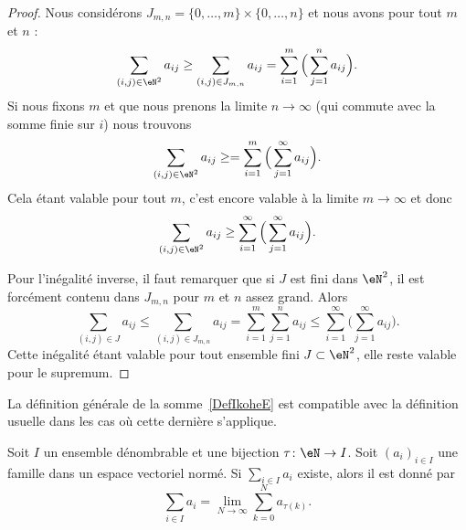 \begin{proof}
    Nous considérons \( J_{m,n}=\{ 0,\ldots, m \}\times \{ 0,\ldots, n \}\) et nous avons pour tout \( m\) et \( n\) :
    \begin{equation}
        \sum_{(i,j)\in \eN^2}a_{ij}\geq \sum_{(i,j)\in J_{m,n}}a_{ij}=\sum_{i=1}^m\Big( \sum_{j=1}^na_{ij} \Big).
    \end{equation}
    Si nous fixons \( m\) et que nous prenons la limite \( n\to \infty\) (qui commute avec la somme finie sur \( i\)) nous trouvons
    \begin{equation}
        \sum_{(i,j)\in \eN^2}a_{ij}\geq =\sum_{i=1}^m\Big( \sum_{j=1}^{\infty}a_{ij} \Big).
    \end{equation}
    Cela étant valable pour tout \( m\), c'est encore valable à la limite \( m\to \infty\) et donc
    \begin{equation}
        \sum_{(i,j)\in \eN^2}a_{ij}\geq \sum_{i=1}^{\infty}\Big( \sum_{j=1}^{\infty}a_{ij} \Big).
    \end{equation}

    Pour l'inégalité inverse, il faut remarquer que si \( J\) est fini dans \( \eN^2\), il est forcément contenu dans \( J_{m,n}\) pour \( m\) et \( n\) assez grand. Alors
    \begin{equation}
        \sum_{(i,j)\in J}a_{ij}\leq \sum_{(i,j)\in J_{m,n}}a_{ij}=\sum_{i=1}^m\sum_{j=1}^na_{ij}\leq \sum_{i=1}^{\infty}\Big( \sum_{j=1}^{\infty}a_{ij} \Big).
    \end{equation}
    Cette inégalité étant valable pour tout ensemble fini \( J\subset \eN^2\), elle reste valable pour le supremum.
\end{proof}

La définition générale de la somme~\ref{DefIkoheE} est compatible avec la définition usuelle dans les cas où cette dernière s'applique.
\begin{proposition}\label{PropoWHdjw}
    Soit \( I\) un ensemble dénombrable et une bijection \( \tau\colon \eN\to I\). Soit \( (a_i)_{i\in I}\) une famille dans un espace vectoriel normé.  Si \( \sum_{i\in I}a_i\) existe, alors il est donné par
    \begin{equation}
        \sum_{i\in I}a_i=\lim_{N\to \infty} \sum_{k=0}^Na_{\tau(k)}.
    \end{equation}
\end{proposition}

